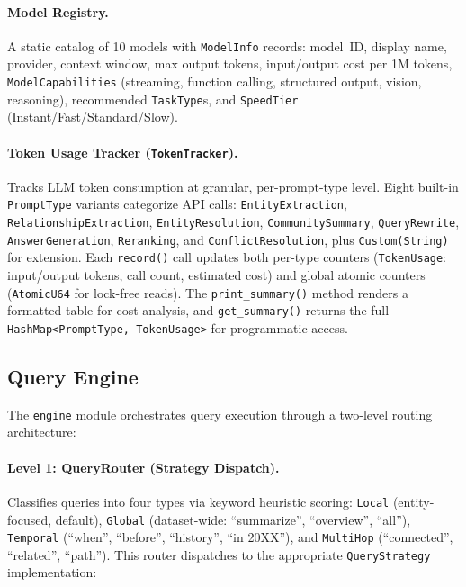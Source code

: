 \documentclass[11pt,a4paper,twocolumn]{article}
\begin{document}
\paragraph{Model Registry.}
A static catalog of 10 models with \texttt{ModelInfo} records:
model~ID, display name, provider, context window, max output tokens,
input/output cost per 1M tokens, \texttt{ModelCapabilities}
(streaming, function calling, structured output, vision, reasoning),
recommended \texttt{TaskType}s, and \texttt{SpeedTier}
(Instant/Fast/Standard/Slow).

\paragraph{Token Usage Tracker (\texttt{TokenTracker}).}
Tracks LLM token consumption at granular, per-prompt-type level.
Eight built-in \texttt{PromptType} variants categorize API calls:
\texttt{EntityExtraction}, \texttt{RelationshipExtraction},
\texttt{EntityResolution}, \texttt{CommunitySummary},
\texttt{QueryRewrite}, \texttt{AnswerGeneration}, \texttt{Reranking},
and \texttt{ConflictResolution}, plus \texttt{Custom(String)} for
extension. Each \texttt{record()} call updates both per-type
counters (\texttt{TokenUsage}: input/output tokens, call count,
estimated cost) and global atomic counters
(\texttt{AtomicU64} for lock-free reads). The \texttt{print\_summary()}
method renders a formatted table for cost analysis, and
\texttt{get\_summary()} returns the full
\texttt{HashMap<PromptType, TokenUsage>} for programmatic access.

\subsection{Query Engine}
\label{sec:engine}

The \texttt{engine} module orchestrates query execution through
a two-level routing architecture:

\paragraph{Level 1: QueryRouter (Strategy Dispatch).}
Classifies queries into four types via keyword heuristic scoring:
\texttt{Local} (entity-focused, default), \texttt{Global}
(dataset-wide: ``summarize'', ``overview'', ``all''),
\texttt{Temporal} (``when'', ``before'', ``history'', ``in 20XX''),
and \texttt{MultiHop} (``connected'', ``related'', ``path'').
This router dispatches to the appropriate \texttt{QueryStrategy}
implementation:
\end{document}
